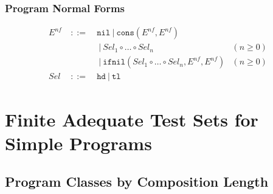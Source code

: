 \documentclass{beamer}
\begin{document}
\begin{frame}
  \frametitle{Program Normal Forms}
  \[\begin{array}{lclr}
  E^{nf} & ~::=~ & \texttt{nil} ~|~ \texttt{cons}(E^{nf}, E^{nf}) & \\
         &       & ~|~ \mathit{Sel}_1 \circ \ldots \circ \mathit{Sel}_n & (n \ge 0) \\
         &       & ~|~ \texttt{ifnil}(\mathit{Sel}_1 \circ \ldots \circ \mathit{Sel}_n, E^{nf}, E^{nf}) & (n \ge 0) \\
  \mathit{Sel} & ~::=~ & \texttt{hd} ~|~ \texttt{tl} & 
  \end{array}
  \]
\end{frame}

\section{Finite Adequate Test Sets for Simple Programs}

\subsection{Program Classes by Composition Length}
\end{document}
